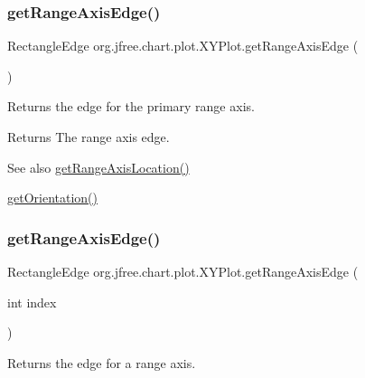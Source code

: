 \subsubsection{\texorpdfstring{get\+Range\+Axis\+Edge()}{getRangeAxisEdge()}\hspace{0.1cm}{\footnotesize\ttfamily [1/2]}}
{\footnotesize\ttfamily Rectangle\+Edge org.\+jfree.\+chart.\+plot.\+X\+Y\+Plot.\+get\+Range\+Axis\+Edge (\begin{DoxyParamCaption}{ }\end{DoxyParamCaption})}

Returns the edge for the primary range axis.

\begin{DoxyReturn}{Returns}
The range axis edge.
\end{DoxyReturn}
\begin{DoxySeeAlso}{See also}
\mbox{\hyperlink{classorg_1_1jfree_1_1chart_1_1plot_1_1_x_y_plot_a6fb19e12902c04095a10b90a2c22dc05}{get\+Range\+Axis\+Location()}} 

\mbox{\hyperlink{classorg_1_1jfree_1_1chart_1_1plot_1_1_x_y_plot_a5b0c5d43d190ffdfc7cdee341c0e6990}{get\+Orientation()}} 
\end{DoxySeeAlso}
\mbox{\label{classorg_1_1jfree_1_1chart_1_1plot_1_1_x_y_plot_a625b18ac16110da5e9dd366dacbeb529}} 
\subsubsection{\texorpdfstring{get\+Range\+Axis\+Edge()}{getRangeAxisEdge()}\hspace{0.1cm}{\footnotesize\ttfamily [2/2]}}
{\footnotesize\ttfamily Rectangle\+Edge org.\+jfree.\+chart.\+plot.\+X\+Y\+Plot.\+get\+Range\+Axis\+Edge (\begin{DoxyParamCaption}\item[{int}]{index }\end{DoxyParamCaption})}

Returns the edge for a range axis.


